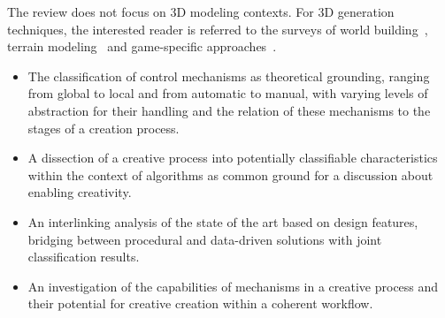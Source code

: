 The review does not focus on 3D modeling contexts. For 3D generation techniques, the interested reader is referred to the surveys of world building~\cite{smelik_2014_aso, aliaga_2016_ipm}, terrain modeling~\cite{galin_2019_aro} and game-specific approaches~\cite{hendrikx_2013_pcg, togelius_2011_sbp}.



\begin{itemize}
    \item The classification of control mechanisms as theoretical grounding, ranging from global to local and from automatic to manual, with varying levels of abstraction for their handling and the relation of these mechanisms to the stages of a creation process. 
    \item A dissection of a creative process into potentially classifiable characteristics within the context of algorithms as common ground for a discussion about enabling creativity.
    \item An interlinking analysis of the state of the art based on design features, bridging between procedural and data-driven solutions with joint classification results. 
    \item An investigation of the capabilities of mechanisms in a creative process and their potential for creative creation within a coherent workflow.
\end{itemize}

